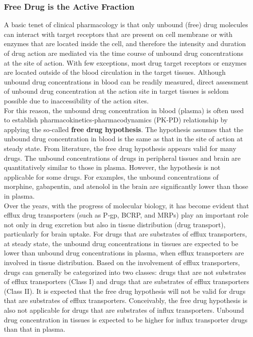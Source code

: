 \documentclass{book}
\begin{document}
\subsubsection{Free Drug is the Active Fraction}

A basic tenet of clinical pharmacology is that only unbound (free) drug molecules can interact with target receptors that are present on cell membrane or with enzymes that are located inside the cell, and therefore the intensity and duration of drug action are mediated via the time course of unbound drug concentrations at the site of action. 
With few exceptions, most drug target receptors or enzymes are located outside of the blood circulation in the target tissues. 
Although unbound drug concentrations in blood can be readily measured, direct assessment of unbound drug concentration at the action site in target tissues is seldom possible due to inaccessibility of the action sites.
\\
For this reason, the unbound drug concentration in blood (plasma) is often used to establish pharmacokinetics‐pharmacodynamics (PK‐PD) relationship by applying the so‐called \textbf{free drug hypothesis}. 
The hypothesis assumes that the unbound drug concentration in blood is the same as that in the site of action at steady state.
From literature, the free drug hypothesis appears valid for many drugs. 
The unbound concentrations of drugs in peripheral tissues and brain are quantitatively similar to those in plasma.
However, the hypothesis is not applicable for some drugs. For examples, the unbound concentrations of morphine, gabapentin, and atenolol in the brain are significantly lower than those in plasma.
\\
Over the years, with the progress of molecular biology, it has become evident that efflux drug transporters (such as P‐gp, BCRP, and MRPs) play an important role not only in drug excretion but also in tissue distribution (drug transport), particularly for brain uptake.
For drugs that are substrates of efflux transporters, at steady state, the unbound drug concentrations in tissues are expected to be lower than unbound drug concentrations in plasma, when efflux transporters are involved in tissue distribution. 
Based on the involvement of efflux transporters, drugs can generally be categorized into two classes: drugs that are not substrates of efflux transporters (Class I) and drugs that are substrates of efflux transporters (Class II). 
It is expected that the free drug hypothesis will not be valid for drugs that are substrates of efflux transporters. 
Conceivably, the free drug hypothesis is also not applicable for drugs that are substrates of influx transporters. 
Unbound drug concentration in tissues is expected to be higher for influx transporter drugs than that in plasma.
\end{document}
